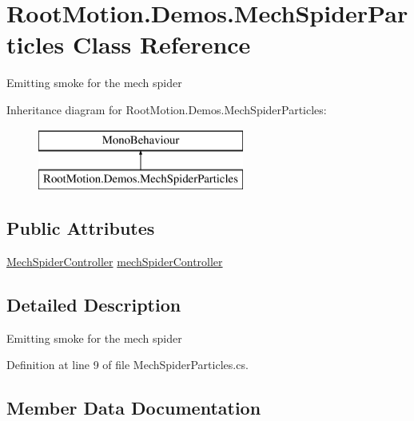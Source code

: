 \hypertarget{class_root_motion_1_1_demos_1_1_mech_spider_particles}{}\section{Root\+Motion.\+Demos.\+Mech\+Spider\+Particles Class Reference}
\label{class_root_motion_1_1_demos_1_1_mech_spider_particles}


Emitting smoke for the mech spider  


Inheritance diagram for Root\+Motion.\+Demos.\+Mech\+Spider\+Particles\+:\begin{figure}[H]
\begin{center}
\leavevmode
\includegraphics[height=2.000000cm]{class_root_motion_1_1_demos_1_1_mech_spider_particles}
\end{center}
\end{figure}
\subsection*{Public Attributes}
\begin{DoxyCompactItemize}
\item 
\mbox{\hyperlink{class_root_motion_1_1_demos_1_1_mech_spider_controller}{Mech\+Spider\+Controller}} \mbox{\hyperlink{class_root_motion_1_1_demos_1_1_mech_spider_particles_af4060795068238da710d800277cdbf20}{mech\+Spider\+Controller}}
\end{DoxyCompactItemize}


\subsection{Detailed Description}
Emitting smoke for the mech spider 



Definition at line 9 of file Mech\+Spider\+Particles.\+cs.



\subsection{Member Data Documentation}
\mbox{\label{class_root_motion_1_1_demos_1_1_mech_spider_particles_af4060795068238da710d800277cdbf20}} 
